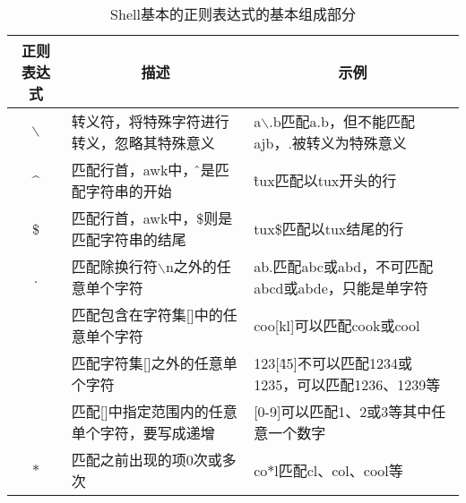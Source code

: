 
\begin{table}[p]
	\renewcommand{\arraystretch}{1.5}
	\newcommand{\tc}[1]{\multicolumn{1}{c}{#1}}
	\newcommand{\tl}[1]{\multicolumn{1}{l}{#1}}
	\newcommand{\tr}[1]{\multicolumn{1}{r}{#1}}
	\centering
	\begin{sideways}
		\begin{minipage}{\textheight}
			\caption[regexp]{Shell基本的正则表达式的基本组成部分}
			\vspace{0.8em}\centering\wuhao
			\begin{tabular}{cll}
				\toprule[2pt]
				\textbf{正则表达式} & \tc{\textbf{描述}} & \tc{\textbf{示例}}\\[2pt]\midrule[0.8pt]
				$\backslash$ & 转义符，将特殊字符进行转义，忽略其特殊意义 & a$\backslash$.b匹配a.b，但不能匹配ajb，.被转义为特殊意义\\[8pt]
				\^{} & 匹配行首，awk中，\^ 则是匹配字符串的开始 & \^tux匹配以tux开头的行\\[8pt]
				\$ & 匹配行首，awk中，\$则是匹配字符串的结尾 & tux\$匹配以tux结尾的行\\[8pt]
				. & 匹配除换行符$\backslash$n之外的任意单个字符 & ab.匹配abc或abd，不可匹配abcd或abde，只能是单字符\\[8pt]
				[ ] & 匹配包含在字符集[]中的任意单个字符 & coo[kl]可以匹配cook或cool\\[8pt]
				[ \^ \ ] & 匹配字符集[]之外的任意单个字符 & 123[\^45]不可以匹配1234或1235，可以匹配1236、1239等\\[8pt]
				[$-$] & 匹配[]中指定范围内的任意单个字符，要写成递增 & [0-9]可以匹配1、2或3等其中任意一个数字\\[8pt]
				$\ast$ & 匹配之前出现的项0次或多次 & co$\ast$l匹配cl、col、cool等\\[8pt]
				\bottomrule[2pt]
			\end{tabular}
		\end{minipage}
	\end{sideways}
\end{table}

